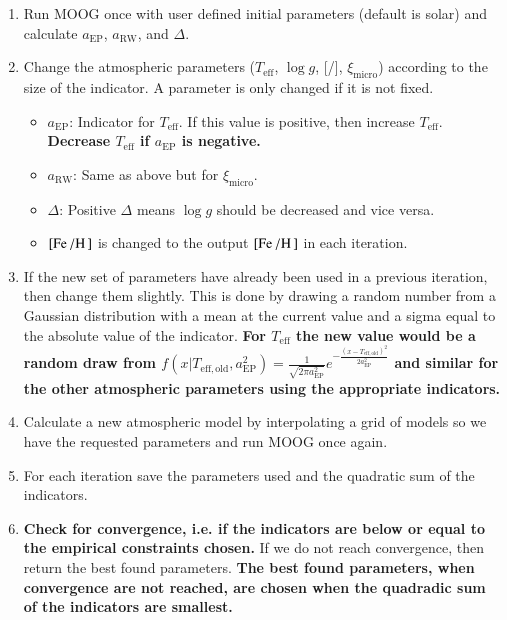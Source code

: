 \documentclass{aa}
\begin{document}
\begin{enumerate}
    \item Run MOOG once with user defined initial parameters (default is
          solar) and calculate $a_\mathrm{EP}$, $a_\mathrm{RW}$, and
          $\Delta$.
    \item Change the atmospheric parameters ($T_\mathrm{eff}$, $\log g$,
          [/], $\xi_\mathrm{micro}$) according to the size of the
          indicator. A parameter is only changed if it is not fixed.
    \begin{itemize}
        \item $a_\mathrm{EP}$: Indicator for $T_\mathrm{eff}$. If this value
              is positive, then increase $T_\mathrm{eff}$. {\bf Decrease $T_\mathrm{eff}$
              if $a_\mathrm{EP}$ is negative.}
        \item $a_\mathrm{RW}$: Same as above but for $\xi_\mathrm{micro}$.
        \item $\Delta$: Positive $\Delta$ means $\log g$
              should be decreased and vice versa.
        \item $[\ion{Fe}{}/\ion{H}{}]$ is changed to the output
              $[\ion{Fe}{}/\ion{H}{}]$ in each iteration.
    \end{itemize}
    \item If the new set of parameters have already been used in a previous
          iteration, then change them slightly. This is done by drawing a random
          number from a Gaussian distribution with a mean at the current value
          and a sigma equal to the absolute value of the indicator. {\bf For $T_\mathrm{eff}$
          the new value would be a random draw from
          $f(x|T_\mathrm{eff,old},a_\mathrm{EP}^2) = \frac{1}{\sqrt{2\pi a_\mathrm{EP}^2 }}e^{-\frac{(x - T_\mathrm{eff,old})^2 } {2 a_\mathrm{EP}^2} }$
          and similar for the other atmospheric parameters using the appropriate
          indicators.}
    \item Calculate a new atmospheric model by interpolating a grid of models
          so we have the requested parameters and run MOOG once again.
    \item For each iteration save the parameters used and the quadratic sum of
          the indicators.
    \item {\bf Check for convergence, i.e. if the indicators are below or equal
          to the empirical constraints chosen.} If we do not reach convergence,
          then return the best found parameters. {\bf The best found parameters,
          when convergence are not reached, are chosen when the quadradic sum
          of the indicators are smallest.}
\end{enumerate}
\end{document}
